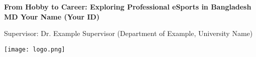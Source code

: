 \documentclass[a0,landscape]{a0poster}
\begin{document}

\begin{minipage}[b]{0.8\linewidth}
\veryHuge \color{RoyalBlue} \textbf{From Hobby to Career: Exploring Professional eSports in Bangladesh} \color{Black}\\ %
\vspace{1cm}
\huge \textbf{MD Your Name (Your ID)} \par
\large Supervisor: Dr. Example Supervisor (Department of Example, University Name)
\end{minipage}
%
\begin{minipage}[b]{0.15\linewidth}
\texttt{[image: logo.png]} %
\end{minipage}

\vspace{1cm}

\end{document}
